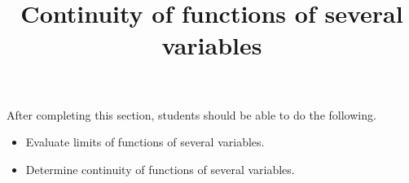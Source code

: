 \documentclass{ximera}
\title{Continuity of functions of several variables}
\begin{document}
\begin{abstract}
\end{abstract}

\maketitle

\begin{sectionOutcomes}

After completing this section, students should be able to do the following.

\begin{itemize}
\item Evaluate limits of functions of several variables.
\item Determine continuity of functions of several variables. 
\end{itemize}

\end{sectionOutcomes}
\end{document}
